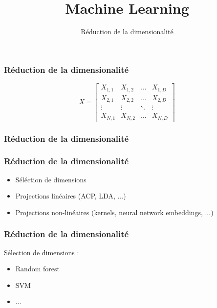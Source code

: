 \documentclass{formation}
\title{Machine Learning}
\subtitle{Réduction de la dimensionalité}
\begin{document}
\maketitle

\begin{frame}
  \frametitle{Réduction de la dimensionalité}
    \begin{center}
    \end{center}
    \[
    X = \begin{bmatrix}
      X_{1,1} & X_{1,2} & \dots  & X_{1,D} \\
      X_{2,1} & X_{2,2} & \dots  & X_{2,D} \\
      \vdots & \vdots & \ddots & \vdots \\
      X_{N,1} & X_{N,2} & \dots  & X_{N,D}
    \end{bmatrix}
    \]
\end{frame}

\begin{frame}
  \frametitle{Réduction de la dimensionalité}
    \begin{center}
    \end{center}
\end{frame}

\begin{frame}
  \frametitle{Réduction de la dimensionalité}
    \begin{itemize}
    \item Séléction de dimensions
    \item Projections linéaires (ACP, LDA, ...)
    \item Projections non-linéaires (kernels, neural network embeddings, ...)
    \end{itemize}
\end{frame}

\begin{frame}
  \frametitle{Réduction de la dimensionalité}
  Sélection de dimensions :
  \begin{itemize}
  \item Random forest
  \item SVM
  \item ...
  \end{itemize}
\end{frame}
\end{document}
